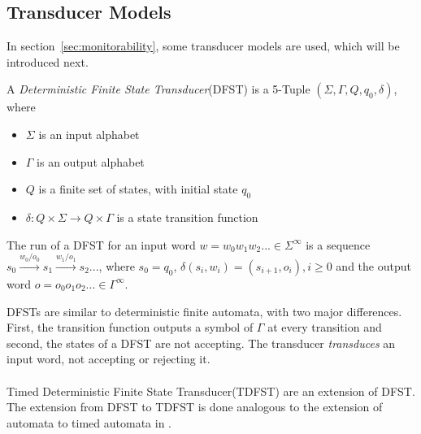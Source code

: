 	\subsection{Transducer Models}
		In section~\ref{sec:monitorability}, some transducer models are used, which will be introduced next.
		\begin{definition}
			A \textit{Deterministic Finite State Transducer}(DFST) is a 5-Tuple $(\Sigma, \Gamma, Q, q_0, \delta)$, where
			\begin{itemize}
				\item
				$\Sigma$ is an input alphabet
				\item
				$\Gamma$ is an output alphabet
				\item
				$Q$ is a finite set of states, with initial state $q_0$
				\item
				$\delta:Q\times\Sigma\rightarrow Q\times\Gamma$ is a state transition function 
			\end{itemize}
			The run of a DFST for an input word $w=w_0w_1w_2...\in\Sigma^\infty$ is a sequence $s_0\xrightarrow{w_0/o_0} s_1\xrightarrow{w_1/o_1} s_2...$, where $s_0=q_0$, $\delta(s_i,w_i)=(s_{i+1}, o_i), i \geq 0$ and the output word $o=o_0o_1o_2...\in\Gamma^\infty$.
		\end{definition}
		DFSTs are similar to deterministic finite automata, with two major differences. First, the transition function outputs a symbol of $\Gamma$ at every transition and second, the states of a DFST are not accepting. The transducer \textit{transduces} an input word, not accepting or rejecting it.\\ \\
		Timed Deterministic Finite State Transducer(TDFST) are an extension of DFST. The extension from DFST to TDFST is done analogous to the extension of automata to timed automata in \cite{ALUR1994183}.
